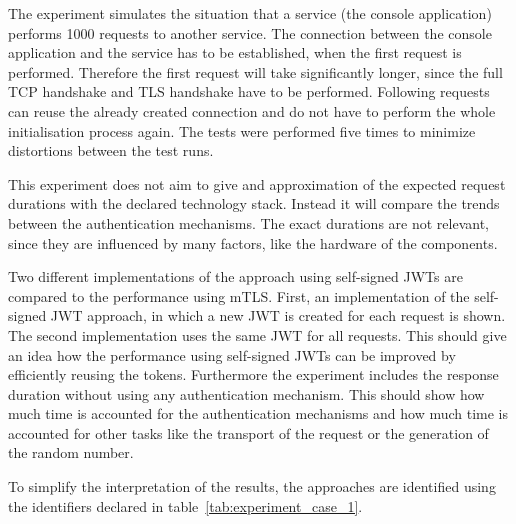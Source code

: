 The experiment simulates the situation that a service (the console application) performs 1000 requests to another service.
The connection between the console application and the service has to be established, when the first request is performed.
Therefore the first request will take significantly longer, since the full TCP handshake and TLS handshake have to be performed.
Following requests can reuse the already created connection and do not have to perform the whole initialisation process again.
The tests were performed five times to minimize distortions between the test runs.

This experiment does not aim to give and approximation of the expected request durations with the declared technology stack.
Instead it will compare the trends between the authentication mechanisms.
The exact durations are not relevant, since they are influenced by many factors, like the hardware of the components.

Two different implementations of the approach using self-signed JWTs are compared to the performance using mTLS.
First, an implementation of the self-signed JWT approach, in which a new JWT is created for each request is shown.
The second implementation uses the same JWT for all requests.
This should give an idea how the performance using self-signed JWTs can be improved by efficiently reusing the tokens.
Furthermore the experiment includes the response duration without using any authentication mechanism.
This should show how much time is accounted for the authentication mechanisms and how much time is accounted for other tasks like the transport of the request or the generation of the random number.

To simplify the interpretation of the results, the approaches are identified using the identifiers declared in table~\ref{tab:experiment_case_1}.

